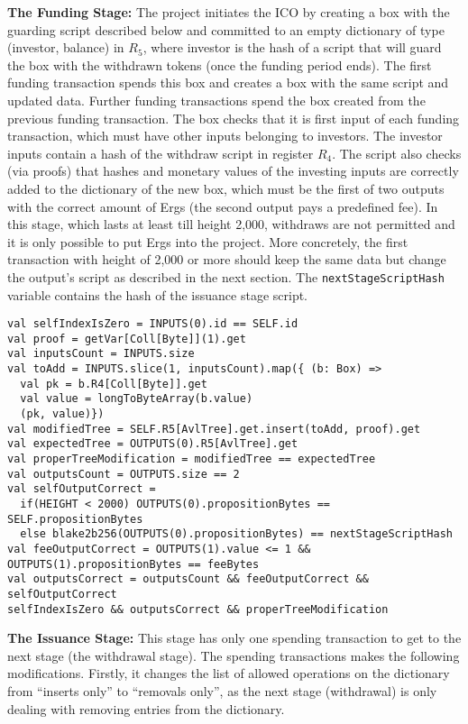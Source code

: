 \documentclass[runningheads]{llncs}
\begin{document}
\textbf{The Funding Stage:} 
The project initiates the ICO by creating a box with the guarding script described below and committed to an empty dictionary of type (investor, balance) in $R_5$, where investor is the hash of a script that will guard the box with the withdrawn tokens (once the funding period ends). 
The first funding transaction spends this box and creates a box with the same script and updated data. Further funding transactions spend the box created from the previous funding transaction. The box checks that it is first input of each funding transaction, which must have other inputs belonging to investors. The investor inputs contain a hash of the withdraw script in register $R_4$. 
The script also checks (via proofs) that hashes and monetary values of the investing inputs are correctly added to the dictionary of the new box, which must be the first of two outputs with the correct amount of Ergs (the second output pays a predefined fee). 
In this stage, which lasts at least till height 2,000, withdraws are not permitted and it is only possible to put Ergs into the project. 
More concretely, the first transaction with height of 2,000 or more should keep the same data but change the output's script as described in the next section. 
The \texttt{nextStageScriptHash} variable contains the hash of the issuance stage script.
\small{\begin{verbatim}
val selfIndexIsZero = INPUTS(0).id == SELF.id
val proof = getVar[Coll[Byte]](1).get
val inputsCount = INPUTS.size
val toAdd = INPUTS.slice(1, inputsCount).map({ (b: Box) =>
  val pk = b.R4[Coll[Byte]].get
  val value = longToByteArray(b.value)
  (pk, value)})
val modifiedTree = SELF.R5[AvlTree].get.insert(toAdd, proof).get
val expectedTree = OUTPUTS(0).R5[AvlTree].get
val properTreeModification = modifiedTree == expectedTree
val outputsCount = OUTPUTS.size == 2
val selfOutputCorrect = 
  if(HEIGHT < 2000) OUTPUTS(0).propositionBytes == SELF.propositionBytes
  else blake2b256(OUTPUTS(0).propositionBytes) == nextStageScriptHash
val feeOutputCorrect = OUTPUTS(1).value <= 1 && OUTPUTS(1).propositionBytes == feeBytes
val outputsCorrect = outputsCount && feeOutputCorrect && selfOutputCorrect
selfIndexIsZero && outputsCorrect && properTreeModification
\end{verbatim}
}
\textbf{The Issuance Stage:}
This stage has only one spending transaction to get to the next stage (the withdrawal stage). The spending transactions makes the following modifications. Firstly, it changes the list of allowed operations on the dictionary from ``inserts only'' to ``removals only'', as the next stage (withdrawal) is only dealing with removing entries from the dictionary.
\end{document}
